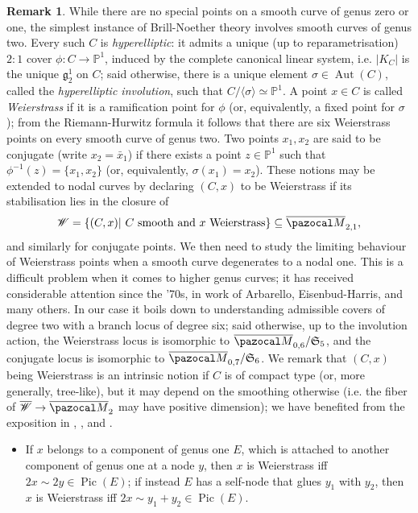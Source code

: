 \documentclass[11pt]{amsart}
\newcommand{\PP}{\mathbb P}
\renewcommand{\to}{\rightarrow}
\newcommand{\oM}{\overline{\pazocal M}}
\newcommand{\Pic}{\operatorname{Pic}}
\newcommand{\Aut}{\operatorname{Aut}}
\theoremstyle{plain}
\theoremstyle{definition}
\newtheorem{rem}[thm]{Remark}
\begin{document}
\begin{rem}\label{rmk:Wandconj}
 While there are no special points on a smooth curve of genus zero or one, the simplest instance of Brill-Noether theory involves smooth curves of genus two. Every such $C$ is \emph{hyperelliptic}: it admits a unique (up to reparametrisation) $2:1$ cover $\phi\colon C\to\PP^1$, induced by the complete canonical linear system, i.e. $\lvert K_C\rvert$ is the unique $\mathfrak g^1_2$ on $C$; said otherwise, there is a unique element $\sigma\in\Aut(C)$, called the \emph{hyperelliptic involution}, such that $C/\langle\sigma\rangle\simeq\PP^1$. A point $x\in C$ is called \emph{Weierstrass} if it is a ramification point for $\phi$ (or, equivalently, a fixed point for $\sigma$); from the Riemann-Hurwitz formula it follows that there are six Weierstrass points on every smooth curve of genus two. Two points $x_1,x_2$ are said to be conjugate (write $x_2=\bar x_1$) if there exists a point $z\in\PP^1$ such that $\phi^{-1}(z)=\{x_1,x_2\}$ (or, equivalently, $\sigma(x_1)=x_2$). These notions may be extended to nodal curves by declaring $(C,x)$ to be Weierstrass if its stabilisation lies in the closure of
 \[\mathcal W=\{(C,x)|\ C\text{ smooth and } x \text{ Weierstrass}\}\subseteq\oM_{2,1},\]
 and similarly for conjugate points. We then need to study the limiting behaviour of Weierstrass points when a smooth curve degenerates to a nodal one. This is a difficult problem when it comes to higher genus curves; it has received considerable attention since the '70s, in work of Arbarello, Eisenbud-Harris, and many others. In our case it boils down to understanding admissible covers \cite{HarrisMumford} of degree two with a branch locus of degree six; said otherwise, up to the involution action, the Weierstrass locus is isomorphic to $\oM_{0,6}/\mathfrak S_5$, and the conjugate locus is isomorphic to  $\oM_{0,7}/\mathfrak S_6$. We remark that $(C,x)$ being Weierstrass is an intrinsic notion if $C$ is of compact type (or, more generally, tree-like), but it may depend on the smoothing otherwise (i.e. the fiber of $\overline{\mathcal W}\to\oM_2$ may have positive dimension); we have benefited from the exposition in \cite[Appendix 2]{Diaz}, \cite[Proposition (3.0.6)]{Cukierman}, and \cite[Theorem 5.45]{HM}.
 \begin{itemize}[leftmargin=.5cm]
  \item If $x$ belongs to a component of genus one $E$, which is attached to another component of genus one at a node $y$, then $x$ is Weierstrass iff $2x\sim 2y\in\Pic(E)$; if instead $E$ has a self-node that glues $y_1$ with $y_2$, then $x$ is Weierstrass iff $2x\sim y_1+y_2\in\Pic(E)$.
  

\end{itemize}
\end{rem}
\end{document}
